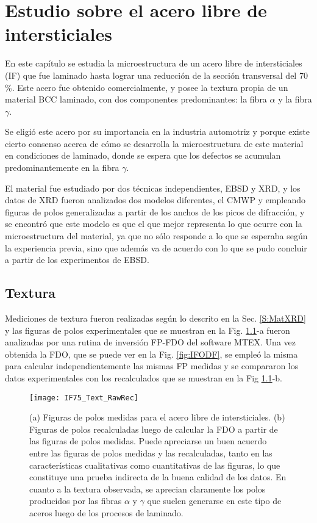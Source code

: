\chapter{Estudio sobre el acero libre de intersticiales}\label{C:IF}
\graphicspath{{./figs/03_IF/}}

En este capítulo se estudia la microestructura de un acero libre de intersticiales (IF) que fue laminado hasta lograr una reducción de la sección transversal del 70\,\%.
Este acero fue obtenido comercialmente, y posee la textura propia de un material BCC laminado, con dos componentes predominantes: la fibra $\alpha$ y la fibra $\gamma$.

Se eligió este acero por su importancia en la industria automotriz y porque existe cierto consenso acerca de cómo se desarrolla la microestructura de este material en condiciones de laminado, donde se espera que los defectos se acumulan predominantemente en la fibra $\gamma$.

El material fue estudiado por dos técnicas independientes, EBSD y XRD, y los datos de XRD fueron analizados dos modelos diferentes, el CMWP y empleando figuras de polos generalizadas a partir de los anchos de los picos de difracción, y se encontró que este modelo es que el que mejor representa lo que ocurre con la microestructura del material, ya que no sólo responde a lo que se esperaba según la experiencia previa, sino que además va de acuerdo con lo que se pudo concluir a partir de los experimentos de EBSD.

\section{Textura}\label{S:IFText}
Mediciones de textura fueron realizadas según lo descrito en la Sec. \ref{S:MatXRD} y las figuras de polos experimentales que se muestran en la Fig. \ref{fig:IFTextRawRec}-a fueron analizadas por una rutina de inversión FP-FDO del software MTEX.
Una vez obtenida la FDO, que se puede ver en la Fig. \ref{fig:IFODF}, se empleó la misma para calcular independientemente las mismas FP medidas y se compararon los datos experimentales con los recalculados que se muestran en la Fig \ref{fig:IFTextRawRec}-b.

\begin{figure}[!htb]
  \centering
  \texttt{[image: IF75\_Text\_RawRec]}
  \caption{(a) Figuras de polos medidas para el acero libre de intersticiales. (b) Figuras de polos recalculadas luego de calcular la FDO a partir de las figuras de polos medidas. Puede apreciarse un buen acuerdo entre las figuras de polos medidas y las recalculadas, tanto en las características cualitativas como cuantitativas de las figuras, lo que constituye una prueba indirecta de la buena calidad de los datos. En cuanto a la textura observada, se aprecian claramente los polos producidos  por las fibras $\alpha$ y $\gamma$ que suelen generarse en este tipo de aceros luego de los procesos de laminado.}
  \label{fig:IFTextRawRec}
\end{figure}

